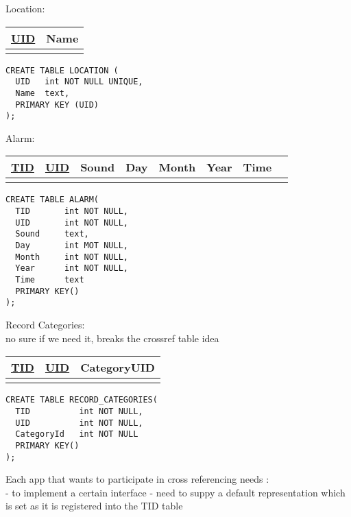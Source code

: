 \noindent
Location: \\            
\begin{tabular}[ht]{|l|l|}
\hline
\underline{UID} & Name  \\
\hline
 &  \\
\hline
\end{tabular}
\begin{verbatim}
CREATE TABLE LOCATION (
  UID   int NOT NULL UNIQUE,
  Name  text,
  PRIMARY KEY (UID)
);
\end{verbatim} 


\noindent
Alarm: \\
\begin{tabular}[ht]{|l|l|l|l|l|l|l|l|}
\hline
\underline{TID} & \underline{UID} & Sound & Day & Month & Year & Time \\
\hline
 & & & & & & \\
\hline
\end{tabular}
\begin{verbatim}
CREATE TABLE ALARM(
  TID       int NOT NULL,
  UID       int NOT NULL,
  Sound     text,
  Day       int MOT NULL,
  Month     int NOT NULL,
  Year      int NOT NULL,
  Time      text
  PRIMARY KEY() 
);
\end{verbatim}

\noindent
Record Categories: \\
no sure if we need it, breaks the crossref table idea \\
\begin{tabular}[ht]{|l|l|l|}
\hline
\underline{TID} & \underline{UID} & CategoryUID\\
\hline
 & &\\
\hline
\end{tabular}
\begin{verbatim}
CREATE TABLE RECORD_CATEGORIES(
  TID          int NOT NULL,
  UID          int NOT NULL,
  CategoryId   int NOT NULL
  PRIMARY KEY() 
);
\end{verbatim}
\pagebreak

\noindent
Each app that wants to participate in cross referencing needs : \\
- to implement a certain interface
- need to suppy a default representation which is set as it is registered into the TID table

